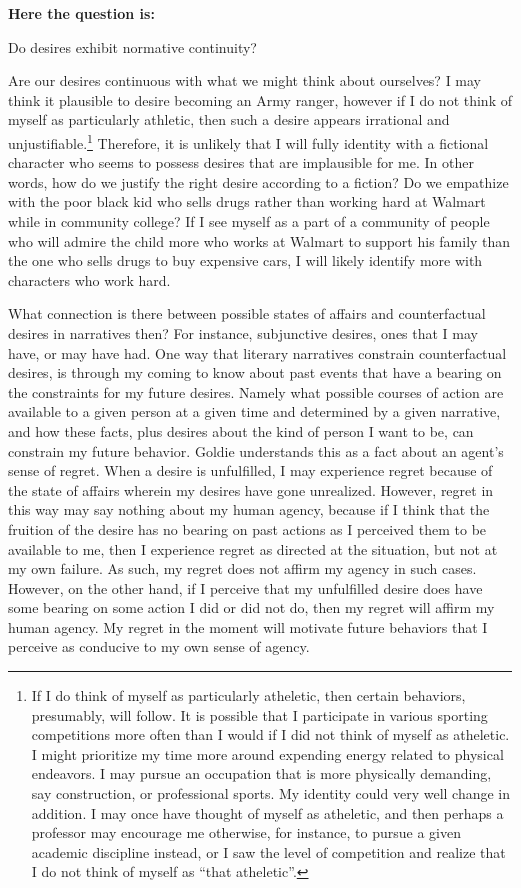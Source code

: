 \documentclass[phdthesis,12pt,final,a4paper]{wuthesis}
\theoremstyle{definition}
\theoremstyle{definition}
\theoremstyle{definition}
\theoremstyle{definition}
\theoremstyle{remark}
\begin{document}
\textbf{Here the question is:}

Do desires exhibit normative continuity?

Are our desires continuous with what we might think about ourselves? I may think it plausible to desire becoming an Army ranger, however if I do not think of myself as particularly athletic, then such a desire appears irrational and unjustifiable.\footnote{If I do think of myself as particularly atheletic, then certain behaviors, presumably, will follow. It is possible that I participate in various sporting competitions more often than I would if I did not think of myself as atheletic. I might prioritize my time more around expending energy related to physical endeavors. I may pursue an occupation that is more physically demanding, say construction, or professional sports. My identity could very well change in addition. I may once have thought of myself as atheletic, and then perhaps a professor may encourage me otherwise, for instance, to pursue a given academic discipline instead, or I saw the level of competition and realize that I do not think of myself as ``that atheletic''.} Therefore, it is unlikely that I will fully identity with a fictional character who seems to possess desires that are implausible for me. In other words, how do we justify the right desire according to a fiction? Do we empathize with the poor black kid who sells drugs rather than working hard at Walmart while in community college? If I see myself as a part of a community of people who will admire the child more who works at Walmart to support his family than the one who sells drugs to buy expensive cars, I will likely identify more with characters who work hard.

What connection is there between possible states of affairs and counterfactual desires in narratives then? For instance, subjunctive desires, ones that I may have, or may have had. One way that literary narratives constrain counterfactual desires, is through my coming to know about past events that have a bearing on the constraints for my future desires. Namely what possible courses of action are available to a given person at a given time and determined by a given narrative, and how these facts, plus desires about the kind of person I want to be, can constrain my future behavior. Goldie understands this as a fact about an agent's sense of regret. When a desire is unfulfilled, I may experience regret because of the state of affairs wherein my desires have gone unrealized. However, regret in this way may say nothing about my human agency, because if I think that the fruition of the desire has no bearing on past actions as I perceived them to be available to me, then I experience regret as directed at the situation, but not at my own failure. As such, my regret does not affirm my agency in such cases. However, on the other hand, if I perceive that my unfulfilled desire does have some bearing on some action I did or did not do, then my regret will affirm my human agency. My regret in the moment will motivate future behaviors that I perceive as conducive to my own sense of agency.
\end{document}
